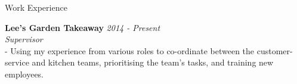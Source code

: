 \documentclass{resume} %
\begin{document}
\begin{rSection}{Work Experience}

{\bf Lee's Garden Takeaway } \hfill {\em 2014 - Present} 
\\{\textit{Supervisor}}
\\- Using my experience from various roles to co-ordinate between the customer-service and kitchen teams, prioritising the team's tasks, and training new employees.

\end{rSection}




\end{document}
